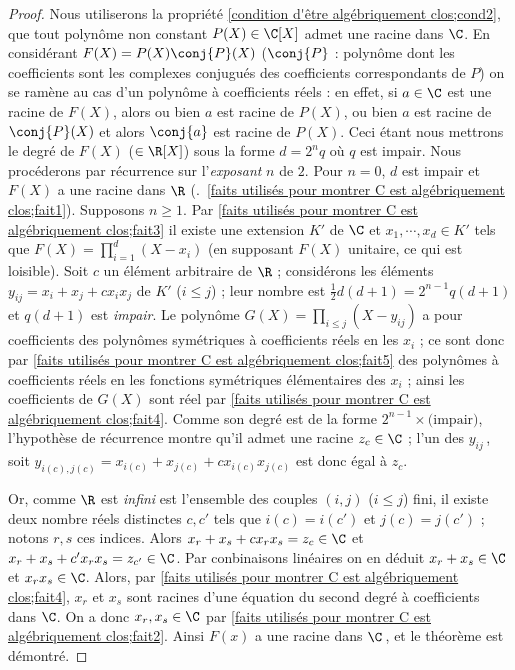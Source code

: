 \documentclass[11pt, useosf,
  title in boldface,
  theorem in new line,
  theorem numbering = section,
  number theorems separately,
]{simplivre}
\begin{document}
    \begin{proof}
        Nous utiliserons la propriété \ref{condition d'être algébriquement clos;cond2}, que tout polynôme non constant \( P(X) \in \C[X] \) admet une racine dans \( \C \). En considérant \( F(X) = P(X) \conj{P}(X) \) (\( \conj{P} \) : polynôme dont les coefficients sont les complexes conjugués des coefficients correspondants de \( P \)) on se ramène au cas d'un polynôme à coefficients réels : en effet, si \( a \in \C \) est une racine de \( F(X) \), alors ou bien \( a \) est racine de \( P(X) \), ou bien \( a \) est racine de \( \conj{P}(X) \) et alors \( \conj{a} \) est racine de \( P(X) \). Ceci étant nous mettrons le degré de \( F(X) \) (\( \in \R[X] \)) sous la forme \( d = 2^n q \) où \( q \) est impair. Nous procéderons par récurrence sur l'\emph{exposant} \( n \) de \( 2 \). Pour \( n = 0 \), \( d \) est impair et \( F(X) \) a une racine dans \( \R \) (\cf.~\ref{faits utilisés pour montrer C est algébriquement clos;fait1}). Supposons \( n \geqslant 1 \). Par \ref{faits utilisés pour montrer C est algébriquement clos;fait3} il existe une extension \( K' \) de \( \C \) et \( x_1, \cdots, x_d \in K' \) tels que \( F(X) = \prod_{i=1}^d (X-x_i) \) (en supposant \( F(X) \) unitaire, ce qui est loisible). Soit \( c \) un élément arbitraire de \( \R \) ; considérons les éléments \( y_{ij} = x_i + x_j + c x_i x_j \) de \( K' \) (\( i \leqslant j \)) ; leur nombre est \( \frac{1}{2} d(d+1) = 2^{n-1} q (d+1) \) et \( q(d+1) \) est \emph{impair}. Le polynôme \( G(X) = \prod_{i \leqslant j} (X-y_{ij}) \) a pour coefficients des polynômes symétriques à coefficients réels en les \( x_i \) ; ce sont donc par \ref{faits utilisés pour montrer C est algébriquement clos;fait5} des polynômes à coefficients réels en les fonctions symétriques élémentaires des \( x_i \) ; ainsi les coefficients de \( G(X) \) sont réel par \ref{faits utilisés pour montrer C est algébriquement clos;fait4}. Comme son degré est de la forme \( 2^{n-1} \times \text{(impair)} \), l'hypothèse de récurrence montre qu'il admet une racine \( z_c \in \C \) ; l'un des \( y_{ij} \)\,, soit \( y_{i(c),j(c)} = x_{i(c)} + x_{j(c)} + c x_{i(c)} x_{j(c)} \) est donc égal à \( z_c \).

        Or, comme \( \R \) est \emph{infini} est l'ensemble des couples \( (i,j) \) (\( i \leqslant j \)) fini, il existe deux nombre réels distinctes \( c, c' \) tels que \( i(c) = i(c') \) et \( j(c) = j(c') \) ; notons \( r,s \) ces indices. Alors \( x_r + x_s + c x_r x_s = z_c \in \C \) et \( x_r + x_s + c' x_r x_s = z_{c'} \in \C \). Par conbinaisons linéaires on en déduit \( x_r + x_s \in \C \) et \( x_r x_s \in \C \). Alors, par \ref{faits utilisés pour montrer C est algébriquement clos;fait4}, \( x_r \) et \( x_s \) sont racines d'une équation du second degré à coefficients dans \( \C \). On a donc \( x_r, x_s \in \C \) par \ref{faits utilisés pour montrer C est algébriquement clos;fait2}. Ainsi \( F(x) \) a une racine dans \( \C \)\,, et le théorème est démontré.
    \end{proof}
\end{document}
